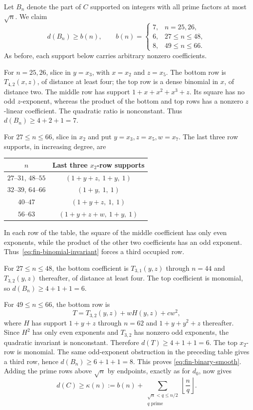 \documentclass[11pt]{article}
\numberwithin{equation}{section}
\theoremstyle{definition}\newtheorem{definition}[theorem]{Definition}
\theoremstyle{remark}\newtheorem{remark}[theorem]{Remark}
\begin{document}
Let $B_n$ denote the part of $C$ supported on integers with all prime
factors at most $\sqrt n$. We claim
\begin{equation}\label{eq:fin-binary-smooth}
 d(B_n)\ge b(n),\qquad
 b(n)=\begin{cases}
 7,&n=25,26,\\
 6,&27\le n\le48,\\
 8,&49\le n\le66.
 \end{cases}
\end{equation}
As before, each support below carries arbitrary nonzero coefficients.

For $n=25,26$, slice in $y=x_3$, with $x=x_2$ and $z=x_5$.
The bottom row is $T_{4,2}(x,z)$, of distance at least four; the top
row is a dense binomial in $x$, of distance two. The middle row has
support $1+x+x^2+x^3+z$. Its square has no odd $z$-exponent, whereas
the product of the bottom and top rows has a nonzero $z$-linear
coefficient. The quadratic ratio is nonconstant. Thus
$d(B_n)\ge4+2+1=7$.

For $27\le n\le66$, slice in $x_2$ and put
$y=x_3,z=x_5,w=x_7$. The last three row supports, in increasing
degree, are
\begin{center}
\begin{tabular}{c|c}
$n$&Last three $x_2$-row supports\\\hline
$27$--$31$, $48$--$55$&$(1+y+z,\ 1+y,\ 1)$\\
$32$--$39$, $64$--$66$&$(1+y,\ 1,\ 1)$\\
$40$--$47$&$(1+y+z,\ 1,\ 1)$\\
$56$--$63$&$(1+y+z+w,\ 1+y,\ 1)$
\end{tabular}
\end{center}
In each row of the table, the square of the middle coefficient has
only even exponents,
while the product of the other two coefficients has an odd exponent.
Thus~\eqref{eq:fin-binomial-invariant} forces a third occupied row.

For $27\le n\le48$, the bottom coefficient is $T_{3,1}(y,z)$
through $n=44$ and $T_{3,2}(y,z)$ thereafter, of distance at least four.
The top coefficient is monomial, so $d(B_n)\ge4+1+1=6$.

For $49\le n\le66$, the bottom row is
\[
 T=T_{3,2}(y,z)+wH(y,z)+cw^2,
\]
where $H$ has support $1+y+z$ through $n=62$ and $1+y+y^2+z$
thereafter. Since $H^2$ has only even exponents and $T_{3,2}$ has
nonzero odd exponents, the quadratic invariant is nonconstant.
Therefore $d(T)\ge4+1+1=6$.
The top $x_2$-row is monomial. The same odd-exponent obstruction in
the preceding table gives a third row, hence
$d(B_n)\ge6+1+1=8$. This proves \eqref{eq:fin-binary-smooth}.
Adding the prime rows above $\sqrt n$ by endpoints, exactly as for
$d_0$, now gives
\begin{equation}\label{eq:fin-kappa}
 d(C)\ge\kappa(n):=b(n)+
       \sum_{\substack{\sqrt n<q\le n/2\\q\text{ prime}}}
                         \left\lfloor\frac nq\right\rfloor.
\end{equation}
\end{document}
